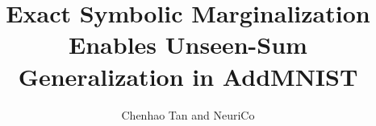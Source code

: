 \documentclass{article}
\title{Exact Symbolic Marginalization Enables Unseen-Sum Generalization in AddMNIST}
\author{Chenhao Tan and NeuriCo}
\begin{document}
\maketitle

\begin{abstract}

\end{abstract}









\end{document}
